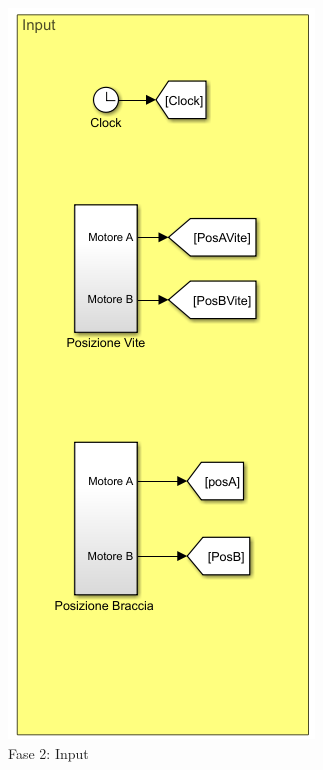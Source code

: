 \begin{figure}[ht]
	\begin{center}
		\includegraphics[scale=0.7]{Immagini/Sperimentale/Input}
		\caption{Fase 2: Input}
		\label{fig:Input}
	\end{center}
\end{figure}
